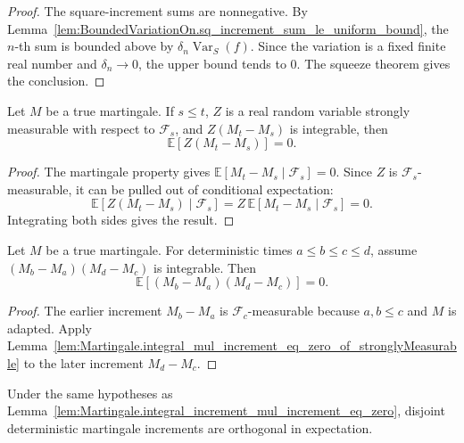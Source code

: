 \begin{proof}
The square-increment sums are nonnegative.  By
Lemma~\ref{lem:BoundedVariationOn.sq_increment_sum_le_uniform_bound}, the
\(n\)-th sum is bounded above by
\(\delta_n\operatorname{Var}_S(f)\).  Since the variation is a fixed finite
real number and \(\delta_n\to0\), the upper bound tends to \(0\).  The squeeze
theorem gives the conclusion.
\end{proof}


\begin{lemma}\label{lem:Martingale.integral_mul_increment_eq_zero_of_stronglyMeasurable}
Let \(M\) be a true martingale.  If \(s\le t\), \(Z\) is a real random
variable strongly measurable with respect to \(\mathcal F_s\), and
\(Z(M_t-M_s)\) is integrable, then
\[
  \mathbb E[Z(M_t-M_s)] = 0.
\]
\end{lemma}

\begin{proof}
The martingale property gives
\(\mathbb E[M_t-M_s\mid\mathcal F_s]=0\).  Since \(Z\) is
\(\mathcal F_s\)-measurable, it can be pulled out of conditional expectation:
\[
  \mathbb E[Z(M_t-M_s)\mid\mathcal F_s]
  =
  Z\,\mathbb E[M_t-M_s\mid\mathcal F_s]
  =
  0.
\]
Integrating both sides gives the result.
\end{proof}

\begin{lemma}\label{lem:Martingale.integral_increment_mul_increment_eq_zero}
Let \(M\) be a true martingale.  For deterministic times
\(a\le b\le c\le d\), assume
\((M_b-M_a)(M_d-M_c)\) is integrable.  Then
\[
  \mathbb E[(M_b-M_a)(M_d-M_c)] = 0.
\]
\end{lemma}

\begin{proof}
The earlier increment \(M_b-M_a\) is \(\mathcal F_c\)-measurable because
\(a,b\le c\) and \(M\) is adapted.  Apply
Lemma~\ref{lem:Martingale.integral_mul_increment_eq_zero_of_stronglyMeasurable}
to the later increment \(M_d-M_c\).
\end{proof}

\begin{lemma}\label{lem:Martingale.integral_mul_increment_eq_zero}
Under the same hypotheses as
Lemma~\ref{lem:Martingale.integral_increment_mul_increment_eq_zero}, disjoint
deterministic martingale increments are orthogonal in expectation.
\end{lemma}


